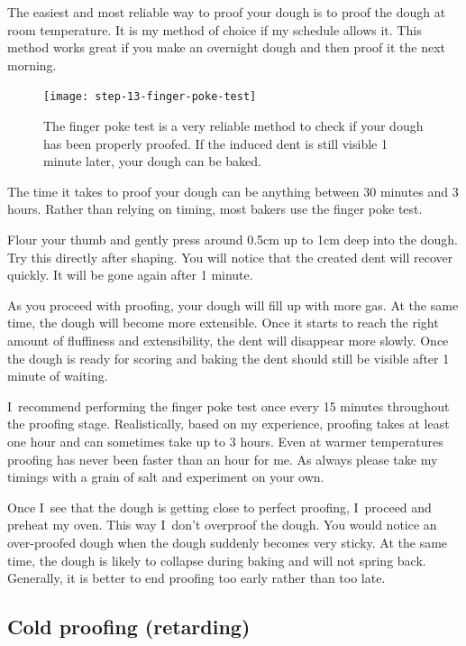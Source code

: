 The easiest and most reliable way to proof your dough is to proof the dough at
room temperature. It is my method of choice if my schedule allows it. This method
works great if you make an overnight dough and then proof it the next
morning.

\begin{figure}[htb!]
  \texttt{[image: step-13-finger-poke-test]}
  \caption{The finger poke test is a very reliable method to check
  if your dough has been properly proofed. If the induced dent is still
  visible 1 minute later, your dough can be baked.}%
  \label{fig:shaping-finger-poke}
\end{figure}

The time it takes to proof your dough can be anything between 30 minutes and
3 hours. Rather than relying on timing, most bakers use the finger poke test.

Flour your thumb and gently press around 0.5cm up to 1cm deep into the dough.
Try this directly after shaping. You will notice that the created dent will
recover quickly. It will be gone again after 1 minute.

As you proceed with proofing, your dough will fill up with more gas. At the
same time, the dough will become more extensible. Once it starts to reach the
right amount of fluffiness and extensibility, the dent will disappear more slowly.
Once the dough is ready for scoring and baking the dent should still be visible after
1 minute of waiting.

I~recommend performing the finger poke test once every 15 minutes throughout
the proofing stage. Realistically, based on my experience, proofing takes at least
one hour and can sometimes take up to 3 hours. Even at warmer temperatures proofing
has never been faster than an hour for me. As always please take my timings with
a grain of salt and experiment on your own.

Once I~see that the dough is getting close to perfect proofing, I~proceed and
preheat my oven. This way I~don't overproof the dough. You would notice an
over-proofed dough when the dough suddenly becomes very sticky. At the same
time, the dough is likely to collapse during baking and will not spring back.
Generally, it is better to end proofing too early rather than too late.

\subsection{Cold proofing (retarding)}

